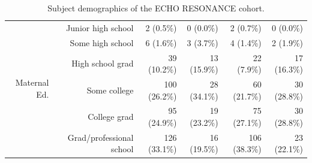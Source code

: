 \documentclass{article}
\begin{document}
\begin{table}[!h]
\begin{tabular}{|r|r|r|r|r|r|}
    \multirow{6}{*}{Maternal Ed.} & Junior high school       & 2 (0.5\%) & 0 (0.0\%) & 2 (0.7\%) & 0 (0.0\%) \\   \cline{2-6}
                                  & Some high school         & 6 (1.6\%) & 3 (3.7\%) & 4 (1.4\%) & 2 (1.9\%) \\ \cline{2-6}
                                  & High school grad         & 39 (10.2\%) & 13 (15.9\%) & 22 (7.9\%) & 17 (16.3\%) \\ \cline{2-6}
                                  & Some college             & 100 (26.2\%) & 28 (34.1\%) & 60 (21.7\%) & 30 (28.8\%) \\ \cline{2-6}
                                  & College grad             & 95 (24.9\%) & 19 (23.2\%) & 75 (27.1\%) & 30 (28.8\%) \\ \cline{2-6}
                                  & Grad/professional school & 126 (33.1\%) & 16 (19.5\%) & 106 (38.3\%) & 23 (22.1\%) \\ \hline\hline
    \end{tabular}
    \caption{\label{tab:demo}Subject demographics of the ECHO RESONANCE cohort.}
\end{table}
\end{document}
